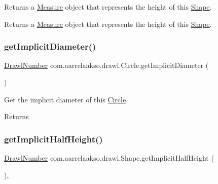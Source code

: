 Returns a \hyperlink{classcom_1_1aarrelaakso_1_1drawl_1_1_measure}{Measure} object that represents the height of this \hyperlink{classcom_1_1aarrelaakso_1_1drawl_1_1_shape}{Shape}. 

\begin{DoxyReturn}{Returns}
a \hyperlink{classcom_1_1aarrelaakso_1_1drawl_1_1_measure}{Measure} object that represents the height of this \hyperlink{classcom_1_1aarrelaakso_1_1drawl_1_1_shape}{Shape}. 
\end{DoxyReturn}
\mbox{\label{classcom_1_1aarrelaakso_1_1drawl_1_1_circle_aa94aa289fa6a02523cceb0a7d46c1115}} 
\subsubsection{\texorpdfstring{get\+Implicit\+Diameter()}{getImplicitDiameter()}}
{\footnotesize\ttfamily \hyperlink{classcom_1_1aarrelaakso_1_1drawl_1_1_drawl_number}{Drawl\+Number} com.\+aarrelaakso.\+drawl.\+Circle.\+get\+Implicit\+Diameter (\begin{DoxyParamCaption}{ }\end{DoxyParamCaption})\hspace{0.3cm}{\ttfamily [protected]}}



Get the implicit diameter of this \hyperlink{classcom_1_1aarrelaakso_1_1drawl_1_1_circle}{Circle}. 

\begin{DoxyReturn}{Returns}

\end{DoxyReturn}
\mbox{\label{classcom_1_1aarrelaakso_1_1drawl_1_1_shape_aa476150489a3a5b634a15a1c03e045d7}} 
\subsubsection{\texorpdfstring{get\+Implicit\+Half\+Height()}{getImplicitHalfHeight()}}
{\footnotesize\ttfamily \hyperlink{classcom_1_1aarrelaakso_1_1drawl_1_1_drawl_number}{Drawl\+Number} com.\+aarrelaakso.\+drawl.\+Shape.\+get\+Implicit\+Half\+Height (\begin{DoxyParamCaption}{ }\end{DoxyParamCaption})\hspace{0.3cm}{\ttfamily [protected]}, {\ttfamily [inherited]}}



